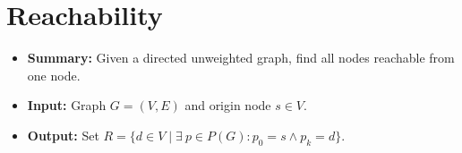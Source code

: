 \section{Reachability}
\begin{itemize}
    \item \textbf{Summary:} Given a directed unweighted graph, find all nodes reachable from one node.
    \item \textbf{Input:} Graph $G=(V,E)$ and origin node $s \in V$.
    \item \textbf{Output:} Set $R=\{d \in V \mid \exists~p \in P(G)\colon p_0 = s \wedge p_k = d\}$.
\end{itemize}

